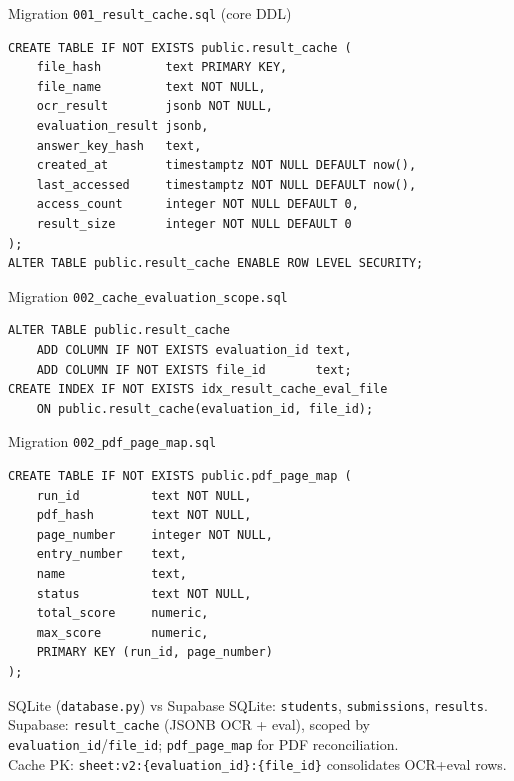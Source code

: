 \documentclass[aspectratio=169]{beamer}
\begin{document}
\begin{frame}[fragile]{Migration \texttt{001\_result\_cache.sql} (core DDL)}
\begin{lstlisting}[style=py]
CREATE TABLE IF NOT EXISTS public.result_cache (
    file_hash         text PRIMARY KEY,
    file_name         text NOT NULL,
    ocr_result        jsonb NOT NULL,
    evaluation_result jsonb,
    answer_key_hash   text,
    created_at        timestamptz NOT NULL DEFAULT now(),
    last_accessed     timestamptz NOT NULL DEFAULT now(),
    access_count      integer NOT NULL DEFAULT 0,
    result_size       integer NOT NULL DEFAULT 0
);
ALTER TABLE public.result_cache ENABLE ROW LEVEL SECURITY;
\end{lstlisting}
\end{frame}

\begin{frame}[fragile]{Migration \texttt{002\_cache\_evaluation\_scope.sql}}
\begin{lstlisting}[style=py]
ALTER TABLE public.result_cache
    ADD COLUMN IF NOT EXISTS evaluation_id text,
    ADD COLUMN IF NOT EXISTS file_id       text;
CREATE INDEX IF NOT EXISTS idx_result_cache_eval_file
    ON public.result_cache(evaluation_id, file_id);
\end{lstlisting}
\end{frame}

\begin{frame}[fragile]{Migration \texttt{002\_pdf\_page\_map.sql}}
\begin{lstlisting}[style=py]
CREATE TABLE IF NOT EXISTS public.pdf_page_map (
    run_id          text NOT NULL,
    pdf_hash        text NOT NULL,
    page_number     integer NOT NULL,
    entry_number    text,
    name            text,
    status          text NOT NULL,
    total_score     numeric,
    max_score       numeric,
    PRIMARY KEY (run_id, page_number)
);
\end{lstlisting}
\end{frame}

\begin{frame}{SQLite (\texttt{database.py}) vs Supabase}
  \footnotesize
  SQLite: \texttt{students}, \texttt{submissions}, \texttt{results}.\\
  Supabase: \texttt{result\_cache} (JSONB OCR + eval), scoped by \texttt{evaluation\_id}/\texttt{file\_id}; \texttt{pdf\_page\_map} for PDF reconciliation.\\
  Cache PK: \texttt{sheet:v2:\{evaluation\_id\}:\{file\_id\}} consolidates OCR+eval rows.
\end{frame}
\end{document}
